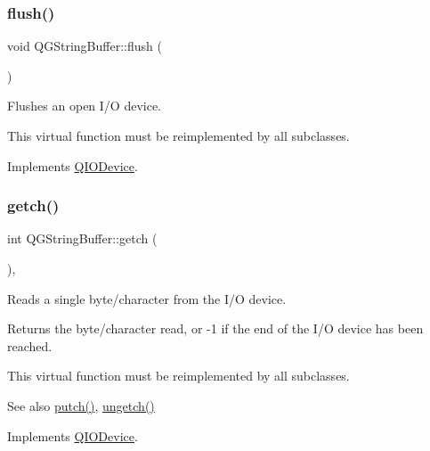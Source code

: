 \subsubsection{\texorpdfstring{flush()}{flush()}}
{\footnotesize\ttfamily void Q\+G\+String\+Buffer\+::flush (\begin{DoxyParamCaption}{ }\end{DoxyParamCaption})\hspace{0.3cm}{\ttfamily [virtual]}}

Flushes an open I/O device.

This virtual function must be reimplemented by all subclasses. 

Implements \mbox{\hyperlink{class_q_i_o_device_a39eccb592ae076fbc42108a3d590fb43}{Q\+I\+O\+Device}}.

\mbox{\label{class_q_g_string_buffer_a20699e4c4ba6d7d68c4422d795412751}} 
\subsubsection{\texorpdfstring{getch()}{getch()}}
{\footnotesize\ttfamily int Q\+G\+String\+Buffer\+::getch (\begin{DoxyParamCaption}{ }\end{DoxyParamCaption})\hspace{0.3cm}{\ttfamily [inline]}, {\ttfamily [virtual]}}

Reads a single byte/character from the I/O device.

Returns the byte/character read, or -\/1 if the end of the I/O device has been reached.

This virtual function must be reimplemented by all subclasses.

\begin{DoxySeeAlso}{See also}
\mbox{\hyperlink{class_q_g_string_buffer_ae2265be83385ba58ff0e47880563bbb5}{putch()}}, \mbox{\hyperlink{class_q_g_string_buffer_a6e97e3b078054bdeb5ee62d6970e7863}{ungetch()}} 
\end{DoxySeeAlso}


Implements \mbox{\hyperlink{class_q_i_o_device_a7cef61d66023f9cda6b0912082bd19fc}{Q\+I\+O\+Device}}.

\mbox{\label{class_q_g_string_buffer_afcecb219691daf1fb5f18f7324fc52b7}} 
